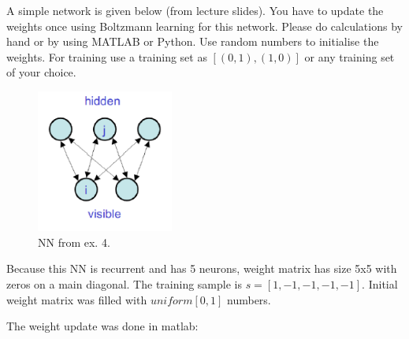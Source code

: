 \documentclass[a4paper, 12pt]{article}
\begin{document}
A simple network is given below (from lecture slides). You have to update the weights once using Boltzmann learning for this network. Please do calculations by hand or by using MATLAB or Python.  Use random numbers to initialise the weights. For training use a training set as $[(0, 1), (1, 0)]$ or any training set of your choice.

\begin{figure}[h]
  \centering
  \caption{NN from ex. 4.\label{fig:4NN}}
  \includegraphics[width=0.4\textwidth]{4}
\end{figure}

Because this NN is recurrent and has 5 neurons, weight matrix has size 5x5 with zeros on a main diagonal. The training sample is $s=[1 ,-1,-1,-1,-1]$. Initial weight matrix was filled with $uniform[0,1]$ numbers.

The weight update was done in matlab:

\medskip


\end{document}
